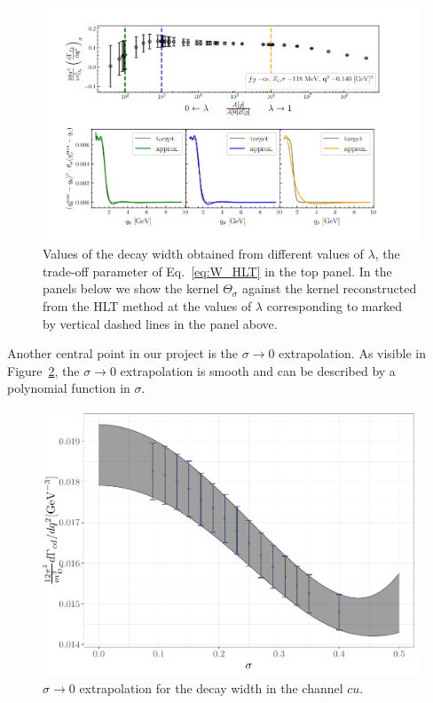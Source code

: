 \documentclass [a4paper, 11pt]{article}
\begin{document}
\begin{figure}
  \includegraphics[scale=0.5]{figures/Screenshot from 2024-07-27 18-12-04.png}
  \caption{Values of the decay width obtained from different values of $\lambda$, the trade-off
    parameter of Eq.~\ref{eq:W_HLT} in the top panel. In the panels below we show the kernel $\Theta_\sigma$ against the kernel reconstructed from the HLT method at the values of  $\lambda$ corresponding to
    marked by vertical dashed lines in the panel above.
  }
  \label{fig:stability}
\end{figure}

Another central point in our project is the $\sigma \to 0$
extrapolation. As visible in Figure~\ref{fig:sigma_extrapolation}, the
$\sigma \to 0$ extrapolation is smooth and can be described by 
a polynomial function in $\sigma$.

\begin{figure}
  \centering
  \includegraphics[scale=0.5]{figures/sigma_extrapolation.pdf}
  \caption{ $\sigma \to 0 $ extrapolation for the decay width in the channel $cu$.
  }
  \label{fig:sigma_extrapolation}
\end{figure}
\end{document}
